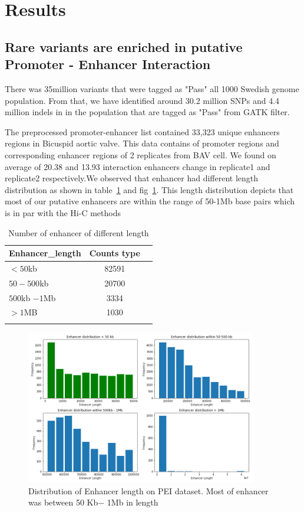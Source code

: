 \documentclass[10pt]{article} %
\begin{document}
\section{Results}

\subsection{Rare variants are enriched in putative Promoter - Enhancer Interaction}
There was 35million variants that were tagged as "Pass" all 1000 Swedish genome population. From that, we have identified around 30.2 million SNPs and 4.4 million indels in in the population that are tagged as "Pass" from GATK filter.

The preprocessed promoter-enhancer list contained 33,323 unique enhancers regions in Bicuspid aortic valve. This data contains of promoter regions and corresponding enhancer regions of 2 replicates from BAV cell. We found on average of 20.38 and 13.93 interaction enhancers change in replicate1 and replicate2 respectively.We observed that enhancer had different length distribution as shown in table~\ref{table1} and fig~\ref{duplcated}. This length distribution depicts that most of our putative enhancers are within the range of 50-1Mb base pairs which is in par with the Hi-C methods

  
\begin{longtable}[]{@{}lcr@{}}
\toprule
 Enhancer\_length & Counts
type\tabularnewline
\midrule
\endhead
$< 50$kb   & 82591\tabularnewline
$50-500$kb   & 20700\tabularnewline
$500$kb $-1$Mb &  3334\tabularnewline
 $> 1$MB & 1030\tabularnewline
\bottomrule
\caption{\small Number of enhancer of different length}
\label{table1}
\end{longtable}

\begin{figure}[H]
\begin{center}
\includegraphics[width=0.9\textwidth]{length_distribution}
\caption{\small Distribution of Enhancer length on PEI dataset. Most of enhancer was between 50 Kb$-$ 1Mb in length}
\label{duplcated}
\end{center}
\end{figure}
\end{document}
